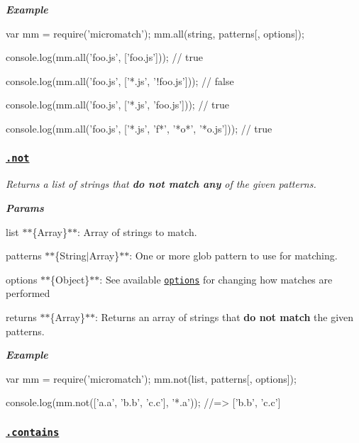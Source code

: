 {\itshape {\bfseries Example}}

{\itshape 
\begin{DoxyCode}
var mm = require('micromatch');
mm.all(string, patterns[, options]);

console.log(mm.all('foo.js', ['foo.js']));
// true

console.log(mm.all('foo.js', ['*.js', '!foo.js']));
// false

console.log(mm.all('foo.js', ['*.js', 'foo.js']));
// true

console.log(mm.all('foo.js', ['*.js', 'f*', '*o*', '*o.js']));
// true
\end{DoxyCode}
}

{\itshape \subsubsection*{\href{index.js#L340}{\tt .not}}}

{\itshape }

{\itshape Returns a list of strings that {\itshape {\bfseries do not match any}} of the given {\ttfamily patterns}.}

{\itshape {\bfseries Params}}

{\itshape 
\begin{DoxyItemize}
\item {\ttfamily list} $\ast$$\ast$\{Array\}$\ast$$\ast$\+: Array of strings to match.
\item {\ttfamily patterns} $\ast$$\ast$\{String$\vert$\+Array\}$\ast$$\ast$\+: One or more glob pattern to use for matching.
\item {\ttfamily options} $\ast$$\ast$\{Object\}$\ast$$\ast$\+: See available \href{#options}{\tt options} for changing how matches are performed
\item {\ttfamily returns} $\ast$$\ast$\{Array\}$\ast$$\ast$\+: Returns an array of strings that {\bfseries do not match} the given patterns.
\end{DoxyItemize}}

{\itshape {\bfseries Example}}

{\itshape 
\begin{DoxyCode}
var mm = require('micromatch');
mm.not(list, patterns[, options]);

console.log(mm.not(['a.a', 'b.b', 'c.c'], '*.a'));
//=> ['b.b', 'c.c']
\end{DoxyCode}
}

{\itshape \subsubsection*{\href{index.js#L376}{\tt .contains}}}

